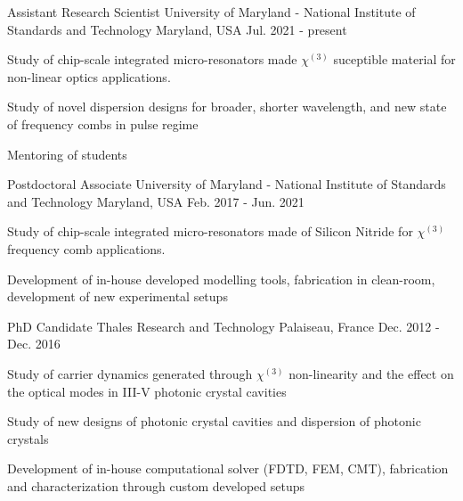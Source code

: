 \documentclass[11pt, letterpaper]{customcv}
\begin{document}
{
    \cventry%
        {Assistant Research Scientist} %
        {University of Maryland - National Institute of Standards and Technology} %
        {Maryland, USA} %
        {Jul. 2021 - present} %
        {
          \begin{cvitems} %
            \item {Study of chip-scale integrated micro-resonators made $\chi^{(3)}$ suceptible material for non-linear optics applications.}
            \item{Study of novel dispersion designs for broader, shorter wavelength, and new state of frequency combs in pulse regime}
            \item{Mentoring of students}
          \end{cvitems}
        }
    \cventry%
        {Postdoctoral Associate} %
        {University of Maryland - National Institute of Standards and Technology} %
        {Maryland, USA} %
        {Feb. 2017 - Jun. 2021} %
        {
          \begin{cvitems} %
            \item {Study of chip-scale integrated micro-resonators made of Silicon Nitride for $\chi^{(3)}$ frequency comb applications.}
            \item{Development of in-house developed modelling tools, fabrication in clean-room, development of new experimental setups}
          \end{cvitems}
        }
    \cventry
        {PhD Candidate} %
        {Thales Research and Technology} %
        {Palaiseau, France} %
        {Dec. 2012 - Dec. 2016} %
        {
          \begin{cvitems} %
            \item {Study of carrier dynamics generated through $\chi^{(3)}$ non-linearity and the effect on the optical modes in III-V photonic crystal cavities}
            \item {Study of new designs of photonic crystal cavities and dispersion of photonic crystals}
            \item {Development of in-house computational solver (FDTD, FEM, CMT), fabrication and characterization through custom developed setups}
          \end{cvitems}
        }
}%
\end{document}
